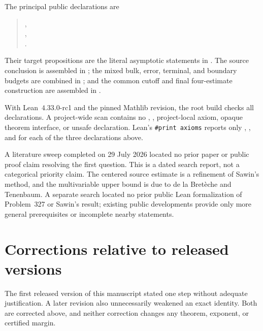 \documentclass[11pt]{article}
\begin{document}
The principal public declarations are
\begin{quote}
,\\
,\\
.
\end{quote}
Their target propositions are the literal asymptotic statements in
. The source conclusion is assembled in
; the mixed bulk, error, terminal, and
boundary budgets are combined in ; and the
common cutoff and final four-estimate construction are assembled in
.

With Lean~\(4.33.0\)-rc1 and the pinned Mathlib revision, the root build checks
all declarations. A project-wide scan contains no ,
, project-local axiom, opaque theorem interface, or unsafe
declaration. Lean's \texttt{\#print axioms} reports only
, , and  for each of
the three declarations above.

A literature sweep completed on 29 July 2026 located no prior paper or public
proof claim resolving the first question. This is a dated search report, not
a categorical priority claim. The centered source estimate is a refinement
of Sawin's method, and the multivariable upper bound is due to de la
Bret\`eche and Tenenbaum. A separate search located no prior public Lean
formalization of Problem~327 or Sawin's result; existing public developments
provide only more general prerequisites or incomplete nearby statements.

\section*{Corrections relative to released versions}

The first released version of this manuscript stated one step without
adequate justification. A later revision also unnecessarily weakened an exact
identity. Both are corrected above, and neither correction changes any
theorem, exponent, or certified margin.
\end{document}
